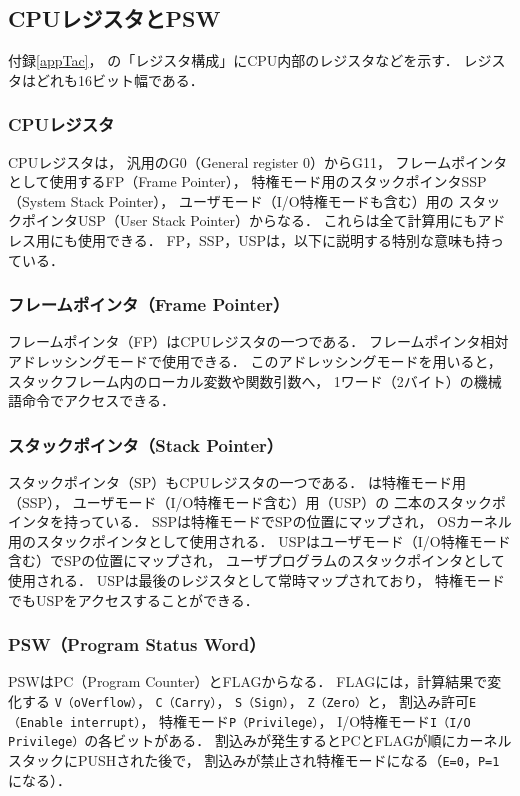 \subsection{CPUレジスタとPSW}
付録\ref{appTac}，
の「レジスタ構成」にCPU内部のレジスタなどを示す．
レジスタはどれも16ビット幅である．

\subsubsection{CPUレジスタ}
CPUレジスタは，
汎用のG0（General register 0）からG11，
フレームポインタとして使用するFP（Frame Pointer），
特権モード用のスタックポインタSSP（System Stack Pointer），
ユーザモード（I/O特権モードも含む）用の
スタックポインタUSP（User Stack Pointer）からなる．
これらは全て計算用にもアドレス用にも使用できる．
FP，SSP，USPは，以下に説明する特別な意味も持っている．

\subsubsection{フレームポインタ（Frame Pointer）}
フレームポインタ（FP）はCPUレジスタの一つである．
フレームポインタ相対アドレッシングモードで使用できる．
このアドレッシングモードを用いると，
スタックフレーム内のローカル変数や関数引数へ，
1ワード（2バイト）の機械語命令でアクセスできる．

\subsubsection{スタックポインタ（Stack Pointer）}
スタックポインタ（SP）もCPUレジスタの一つである．
{\tac}は特権モード用（SSP），
ユーザモード（I/O特権モード含む）用（USP）の
二本のスタックポインタを持っている．
SSPは特権モードでSPの位置にマップされ，
OSカーネル用のスタックポインタとして使用される．
USPはユーザモード（I/O特権モード含む）でSPの位置にマップされ，
ユーザプログラムのスタックポインタとして使用される．
USPは最後のレジスタとして常時マップされており，
特権モードでもUSPをアクセスすることができる．

\subsubsection{PSW（Program Status Word）}
PSWはPC（Program Counter）とFLAGからなる．
FLAGには，計算結果で変化する
\texttt{V（oVerflow）}，
\texttt{C（Carry）}，
\texttt{S（Sign）}，
\texttt{Z（Zero）}と，
割込み許可\texttt{E（Enable interrupt）}，
特権モード\texttt{P（Privilege）}，
I/O特権モード\texttt{I（I/O Privilege）}の各ビットがある．
割込みが発生するとPCとFLAGが順にカーネルスタックにPUSHされた後で，
割込みが禁止され特権モードになる（\texttt{E=0}，\texttt{P=1}になる）．


